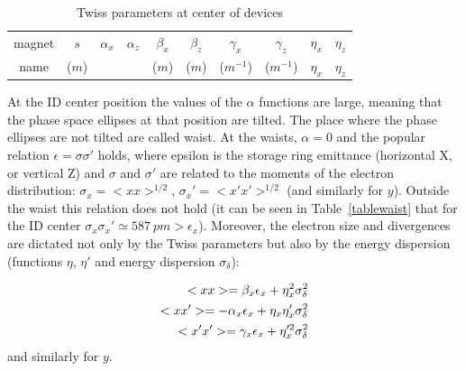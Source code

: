 \documentclass[a4paper,10pt]{article}
\begin{document}
\begin{table}[H]
\label{tabletwiss}
\caption{Twiss parameters at center of devices} 
\vspace{0.3cm}
\begin{tabular}{cccccccccc}      %
\hline
magnet   &  $s$      &  $\alpha_x$ & $\alpha_z$ & $\beta_x$ & $\beta_z$ & $\gamma_x$ &  $\gamma_z$ & $\eta_x$ & $\eta_z$ \\
name     &  ($m$)    &             &            & ($m$)     & ($m$)     & ($m^{-1}$) &  ($m^{-1}$) & $\eta_x$ & $\eta_z$ \\
\hline

\hline

\end{tabular}
\end{table}
% 

At the ID center position the values of the $\alpha$ functions are large, meaning that the phase space ellipses at that position are tilted. 
The place where the phase ellipses are not tilted are called waist. At the waists, $\alpha = 0$ and the popular relation $\epsilon = \sigma \sigma'$
holds, where epsilon is the storage ring emittance (horizontal X, or vertical Z) and $\sigma$ and $\sigma'$ are related to the moments of the electron
distribution: $\sigma_x = <xx>^{1/2}$, $\sigma_x' = <x'x'>^{1/2}$ (and similarly for $y$). Outside the waist this relation does not hold (it can be
seen in Table~\ref{tablewaist} that for the ID center $\sigma_x \sigma_x' \simeq 587~pm > \epsilon_x$). Moreover, the electron size and divergences 
are dictated not only by the Twiss parameters but also by the energy dispersion (functions $\eta$, $\eta'$ and energy dispersion $\sigma_{\delta}$): 

\begin{eqnarray}
    <xx> = \beta_x \epsilon_x + \eta_x^2 \sigma_{\delta}^2 \cr
    <xx'> = - \alpha_x \epsilon_x + \eta_x \eta_x' \sigma_{\delta}^2 \cr
    <x'x'> = \gamma_x \epsilon_x + \eta_x'^2 \sigma_{\delta}^2 
\end{eqnarray}
and similarly for $y$. 
\end{document}
